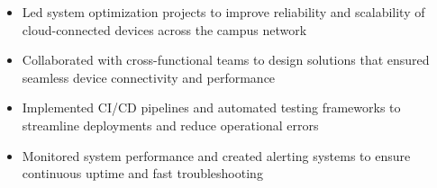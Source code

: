 \par\bigskip
{}
\par\smallskip
\begin{minipage}{13.75cm}
  \begin{minipage}{6.5cm}
    \begin{itemize}
      \item Led system optimization projects to improve reliability and scalability of cloud-connected devices across the campus network
      \item Collaborated with cross-functional teams to design solutions that ensured seamless device connectivity and performance
    \end{itemize}
  \end{minipage}
  \hfill
  \begin{minipage}{6.5cm}
    \begin{itemize}
      \item Implemented CI/CD pipelines and automated testing frameworks to streamline deployments and reduce operational errors
      \item Monitored system performance and created alerting systems to ensure continuous uptime and fast troubleshooting
    \end{itemize}
  \end{minipage}
\end{minipage}
\par\smallskip
\divider

